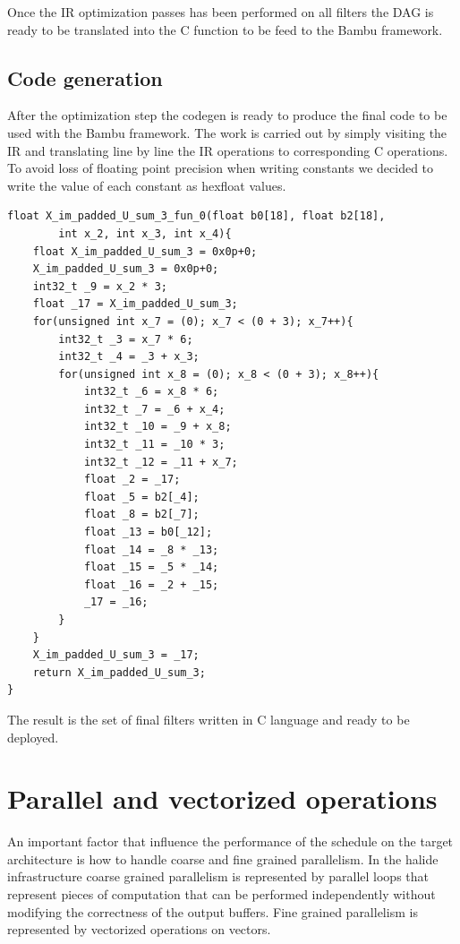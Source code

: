 \documentclass[../main.tex]{subfiles}
\begin{document}
Once the IR optimization passes has been performed on all filters the DAG is ready to be translated into the C function to be feed to the Bambu framework.

\subsection{Code generation}
After the optimization step the codegen is ready to produce the final code to be used with the Bambu framework. The work is carried out by simply visiting the IR and translating line by line the IR operations to corresponding C operations. To avoid loss of floating point precision when writing constants we decided to write the value of each constant as hexfloat values.

\begin{lstlisting}[caption = Output C code of the example filter. The Halide IR has been translated to C code and encapsulated. Since the filter compute only one value a return statement has been added at the end of the function.]
float X_im_padded_U_sum_3_fun_0(float b0[18], float b2[18],
        int x_2, int x_3, int x_4){
    float X_im_padded_U_sum_3 = 0x0p+0;
    X_im_padded_U_sum_3 = 0x0p+0;
    int32_t _9 = x_2 * 3;
    float _17 = X_im_padded_U_sum_3;
    for(unsigned int x_7 = (0); x_7 < (0 + 3); x_7++){
        int32_t _3 = x_7 * 6;
        int32_t _4 = _3 + x_3;
        for(unsigned int x_8 = (0); x_8 < (0 + 3); x_8++){
            int32_t _6 = x_8 * 6;
            int32_t _7 = _6 + x_4;
            int32_t _10 = _9 + x_8;
            int32_t _11 = _10 * 3;
            int32_t _12 = _11 + x_7;
            float _2 = _17;
            float _5 = b2[_4];
            float _8 = b2[_7];
            float _13 = b0[_12];
            float _14 = _8 * _13;
            float _15 = _5 * _14;
            float _16 = _2 + _15;
            _17 = _16;
        }
    }
    X_im_padded_U_sum_3 = _17;
    return X_im_padded_U_sum_3;
}
\end{lstlisting}

The result is the set of final filters written in C language and ready to be deployed.

\section{Parallel and vectorized operations}
An important factor that influence the performance of the schedule on the target architecture is how to handle coarse and fine grained parallelism.
In the halide infrastructure coarse grained parallelism is represented by parallel loops that represent pieces of computation that can be performed independently without modifying the correctness of the output buffers.
Fine grained parallelism is represented by vectorized operations on vectors.
\end{document}
